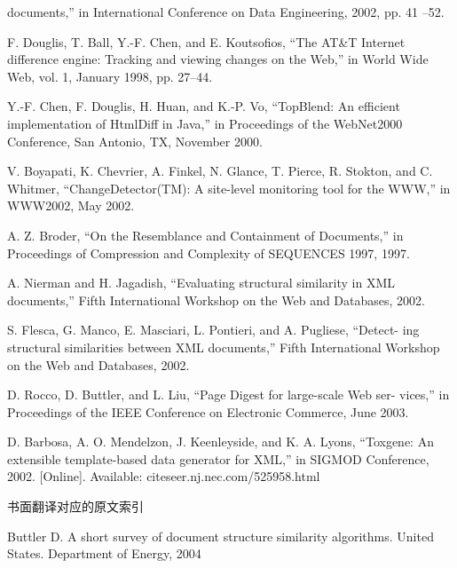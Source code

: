 \begin{spacing}{0.9}
\begin{enumerate}[{[}1{]}]
{  documents,” in International Conference on Data Engineering, 2002, pp. 41
  –52.}
\item{\small F. Douglis, T. Ball, Y.-F. Chen, and E. Koutsofios, “The AT\&T Internet
  difference engine: Tracking and viewing changes on the Web,” in World Wide
  Web, vol. 1, January 1998, pp. 27–44.}
\item{\small Y.-F. Chen, F. Douglis, H. Huan, and K.-P. Vo, “TopBlend: An efficient
  implementation of HtmlDiff in Java,” in Proceedings of the WebNet2000
  Conference, San Antonio, TX, November 2000.}
\item{\small V. Boyapati, K. Chevrier, A. Finkel, N. Glance, T. Pierce, R. Stokton, and
  C. Whitmer, “ChangeDetector(TM): A site-level monitoring tool for the WWW,”
  in WWW2002, May 2002.}
\item{\small A. Z. Broder, “On the Resemblance and Containment of Documents,” in
  Proceedings of Compression and Complexity of SEQUENCES 1997, 1997.}
\item{\small A. Nierman and H. Jagadish, “Evaluating structural similarity in XML
  documents,” Fifth International Workshop on the Web and Databases, 2002.}
\item{\small S. Flesca, G. Manco, E. Masciari, L. Pontieri, and A. Pugliese, “Detect-
  ing structural similarities between XML documents,” Fifth International
  Workshop on the Web and Databases, 2002.}
\item{\small D. Rocco, D. Buttler, and L. Liu, “Page Digest for large-scale Web ser-
  vices,” in Proceedings of the IEEE Conference on Electronic Commerce, June
  2003.}
\item{\small D. Barbosa, A. O. Mendelzon, J. Keenleyside, and K. A. Lyons, “Toxgene:
  An extensible template-based data generator for XML,” in SIGMOD Conference,
  2002. [Online]. Available: citeseer.nj.nec.com/525958.html}
\end{enumerate}  
\end{spacing}
\vspace{20pt}
\begin{center}
  书面翻译对应的原文索引
\end{center}
\begin{spacing}{0.9}
  {\wuhao Buttler D. A short survey of document structure
    similarity algorithms. United States. Department of Energy, 2004}
\end{spacing}


